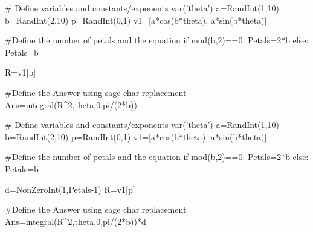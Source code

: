 \begin{sagesilent}
# Define variables and constants/exponents
var('theta')
a=RandInt(1,10)
b=RandInt(2,10)
p=RandInt(0,1)
v1=[a*cos(b*theta), a*sin(b*theta)]

#Define the number of petals and the equation
if mod(b,2)==0:
   Petals=2*b
else:
   Petals=b

R=v1[p]

#Define the Answer using sage char replacement
Ans=integral(R^2,theta,0,pi/(2*b))
\end{sagesilent}


\begin{sagesilent}
# Define variables and constants/exponents
var('theta')
a=RandInt(1,10)
b=RandInt(2,10)
p=RandInt(0,1)
v1=[a*cos(b*theta), a*sin(b*theta)]

#Define the number of petals and the equation
if mod(b,2)==0:
   Petals=2*b
else:
   Petals=b
   
d=NonZeroInt(1,Petals-1)
R=v1[p]

#Define the Answer using sage char replacement
Ans=integral(R^2,theta,0,pi/(2*b))*d
\end{sagesilent}


